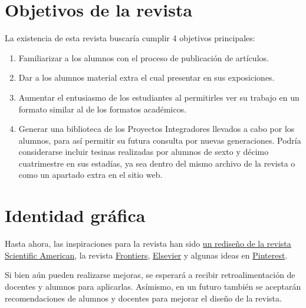 \documentclass{Manual}
\begin{document}
    \frontmatter

\Portada
\Indices



    \mainmatter


\chapter{Objetivos de la revista}

La existencia de esta revista buscaría cumplir 4 objetivos principales:

\begin{enumerate}
    \item Familiarizar a los alumnos con el proceso de publicación de artículos.
    \item Dar a los alumnos material extra el cual presentar en sus exposiciones.
    \item Aumentar el entusiasmo de los estudiantes al permitirles ver su trabajo en un formato similar al de los formatos académicos.
    \item Generar una biblioteca de los Proyectos Integradores llevados a cabo por los alumnos, para así permitir su futura consulta por nuevas generaciones.
        \subitem Podría considerarse incluir tesinas realizadas por alumnos de sexto y décimo cuatrimestre en sus estadías, ya sea dentro del mismo archivo de la revista o como un apartado extra en el sitio web.
\end{enumerate}



\chapter{Identidad gráfica}

Hasta ahora, las inspiraciones para la revista han sido \href{https://www.pentagram.com/work/scientific-american?rel=sector&rel-id=3}{un rediseño de la revista Scientific American}, la revista \href{https://www.frontiersin.org/journals/sustainability/articles/10.3389/frsus.2026.1818134/pdf}{Frontiers}, \href{https://www.sciencedirect.com/science/article/pii/S1198743X26000650/pdfft?pid=1-s2.0-S1198743X26000650-main.pdf}{Elsevier} y algunas ideas en \href{https://pin.it/3s68QTUbZ}{Pinterest}.

Si bien aún pueden realizarse mejoras, se esperará a recibir retroalimentación de docentes y alumnos para aplicarlas. Asímismo, en un futuro también se aceptarán recomendaciones de alumnos y docentes para mejorar el diseño de la revista.
\end{document}

